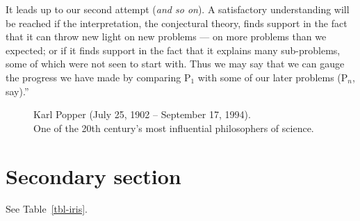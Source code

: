 \documentclass[
12pt,
openright,
oneside,
a4paper,
chapter=TITLE,
section=TITLE,
french,
spanish,
brazil,
english
]{abntex2}\usepackage{array}
\theoremstyle{plain}
\theoremstyle{remark}
\begin{document}
It leads up to our second attempt (\emph{and so on}). A satisfactory
understanding will be reached if the interpretation, the conjectural
theory, finds support in the fact that it can throw new light on new
problems --- on more problems than we expected; or if it finds support
in the fact that it explains many sub-problems, some of which were not
seen to start with. Thus we may say that we can gauge the progress we
have made by comparing \(\text{P}_{1}\) with some of our later problems
(\(\text{P}_{n}\), say).''

\vspace{15pt}

\noindent \hspace*{\fill} \autocite[p.~164]{popper1979}


\begin{figure}[H]

\caption{\label{fig-karl-popper}Karl Popper (July 25, 1902 -- September
17, 1994).\\
One of the 20th century's most influential philosophers of science.}


\end{figure}%

\section{Secondary section}\label{secondary-section}

See Table~\ref{tbl-iris}.
\end{document}
